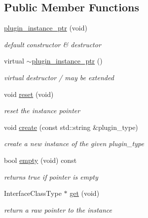 \subsection*{Public Member Functions}
\begin{DoxyCompactItemize}
\item 
\hyperlink{classpion_1_1plugin__instance__ptr_a79eb26b5a1ff329e4893c644a625dcc6}{plugin\-\_\-instance\-\_\-ptr} (void)
\begin{DoxyCompactList}\small\item\em default constructor \& destructor \end{DoxyCompactList}\item 
virtual \hyperlink{classpion_1_1plugin__instance__ptr_a6567dda0004c26eba60a6c714d52c696}{$\sim$plugin\-\_\-instance\-\_\-ptr} ()
\begin{DoxyCompactList}\small\item\em virtual destructor / may be extended \end{DoxyCompactList}\item 
void \hyperlink{classpion_1_1plugin__instance__ptr_a3c6d24f4501a0e1838e5bedd34e20372}{reset} (void)
\begin{DoxyCompactList}\small\item\em reset the instance pointer \end{DoxyCompactList}\item 
void \hyperlink{classpion_1_1plugin__instance__ptr_a7cc8432ad7e88298c719e9b41007e93d}{create} (const std\-::string \&plugin\-\_\-type)
\begin{DoxyCompactList}\small\item\em create a new instance of the given plugin\-\_\-type \end{DoxyCompactList}\item 
bool \hyperlink{classpion_1_1plugin__instance__ptr_ac4655ccda770223a852233c7c9ffb0d0}{empty} (void) const 
\begin{DoxyCompactList}\small\item\em returns true if pointer is empty \end{DoxyCompactList}\item 
Interface\-Class\-Type $\ast$ \hyperlink{classpion_1_1plugin__instance__ptr_a30f57ad0560c0cbdd0f00f345cd3a41a}{get} (void)
\begin{DoxyCompactList}\small\item\em return a raw pointer to the instance \end{DoxyCompactList}\item 

\end{DoxyCompactItemize}
